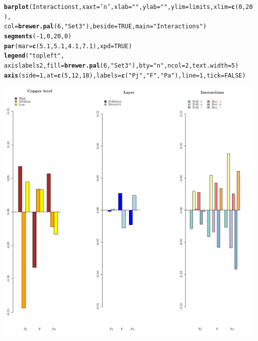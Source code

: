 \documentclass{article}\usepackage[]{graphicx}\usepackage[]{color}
\makeatletter
\def\maxwidth{ %
  \ifdim\Gin@nat@width>\linewidth
    \linewidth
  \else
    \Gin@nat@width
  \fi
}
\newcommand{\hlnum}[1]{\textcolor[rgb]{0.686,0.059,0.569}{#1}}%
\newcommand{\hlstr}[1]{\textcolor[rgb]{0.192,0.494,0.8}{#1}}%
\newcommand{\hlopt}[1]{\textcolor[rgb]{0,0,0}{#1}}%
\newcommand{\hlstd}[1]{\textcolor[rgb]{0.345,0.345,0.345}{#1}}%
\newcommand{\hlkwc}[1]{\textcolor[rgb]{0.333,0.667,0.333}{#1}}%
\newcommand{\hlkwd}[1]{\textcolor[rgb]{0.737,0.353,0.396}{\textbf{#1}}}%
\newenvironment{kframe}{%
 \def\at@end@of@kframe{}%
 \ifinner\ifhmode%
  \def\at@end@of@kframe{\end{minipage}}%
  \begin{minipage}{\columnwidth}%
 \fi\fi%
 \def\FrameCommand##1{\hskip\@totalleftmargin \hskip-\fboxsep
 \colorbox{shadecolor}{##1}\hskip-\fboxsep
     \hskip-\linewidth \hskip-\@totalleftmargin \hskip\columnwidth}%
 \MakeFramed {\advance\hsize-\width
   \@totalleftmargin\z@ \linewidth\hsize
   \@setminipage}}%
 {\par\unskip\endMakeFramed%
 \at@end@of@kframe}
\newenvironment{knitrout}{}{} %
\makeatother
\begin{document}
\begin{knitrout}
\begin{kframe}
\begin{alltt}
\hlkwd{barplot}\hlstd{(Interactionst,} \hlkwc{xaxt}\hlstd{=}\hlstr{'n'}\hlstd{,} \hlkwc{xlab}\hlstd{=}\hlstr{""}\hlstd{,} \hlkwc{ylab}\hlstd{=}\hlstr{""}\hlstd{,} \hlkwc{ylim}\hlstd{=limits,} \hlkwc{xlim}\hlstd{=}\hlkwd{c}\hlstd{(}\hlnum{0}\hlstd{,}\hlnum{20}\hlstd{),}
        \hlkwc{col}\hlstd{=}\hlkwd{brewer.pal}\hlstd{(}\hlnum{6}\hlstd{,} \hlstr{"Set3"}\hlstd{) ,} \hlkwc{beside}\hlstd{=}\hlnum{TRUE}\hlstd{,} \hlkwc{main}\hlstd{=}\hlstr{"Interactions"}\hlstd{)}
\hlkwd{segments}\hlstd{(}\hlopt{-}\hlnum{1}\hlstd{,}\hlnum{0}\hlstd{,} \hlnum{20}\hlstd{,}\hlnum{0}\hlstd{)}
\hlkwd{par}\hlstd{(}\hlkwc{mar}\hlstd{=}\hlkwd{c}\hlstd{(}\hlnum{5.1}\hlstd{,} \hlnum{5.1}\hlstd{,} \hlnum{4.1}\hlstd{,} \hlnum{7.1}\hlstd{),} \hlkwc{xpd}\hlstd{=}\hlnum{TRUE}\hlstd{)}
\hlkwd{legend}\hlstd{(}\hlstr{"topleft"}\hlstd{,}
     \hlstd{axislabels2,} \hlkwc{fill}\hlstd{=}\hlkwd{brewer.pal}\hlstd{(}\hlnum{6}\hlstd{,} \hlstr{"Set3"}\hlstd{),} \hlkwc{bty}\hlstd{=}\hlstr{"n"}\hlstd{,} \hlkwc{ncol}\hlstd{=}\hlnum{2}\hlstd{,}\hlkwc{text.width}\hlstd{=}\hlnum{5}\hlstd{)}
\hlkwd{axis}\hlstd{(}\hlkwc{side}\hlstd{=}\hlnum{1}\hlstd{,} \hlkwc{at}\hlstd{=}\hlkwd{c}\hlstd{(}\hlnum{5}\hlstd{,}\hlnum{12}\hlstd{,}\hlnum{18}\hlstd{),} \hlkwc{labels}\hlstd{=}\hlkwd{c}\hlstd{(} \hlstr{"Pj"}\hlstd{,} \hlstr{"F"}\hlstd{,} \hlstr{"Pa"}\hlstd{),} \hlkwc{line}\hlstd{=}\hlnum{1}\hlstd{,} \hlkwc{tick}\hlstd{=}\hlnum{FALSE}\hlstd{)}
\end{alltt}
\end{kframe}
\includegraphics[width=\maxwidth]{figure/tReco_vs_Post-1} 

\end{knitrout}
\end{document}
